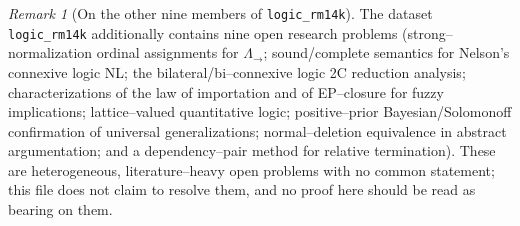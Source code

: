 \documentclass[11pt]{article}
\theoremstyle{definition}
\theoremstyle{remark}
\newtheorem{remark}{Remark}
\begin{document}
\begin{remark}[On the other nine members of \texttt{logic\_rm14k}]
The dataset \texttt{logic\_rm14k} additionally contains nine open research
problems (strong--normalization ordinal assignments for $\Lambda_\to$;
sound/complete semantics for Nelson's connexive logic NL; the
bilateral/bi--connexive logic 2C reduction analysis; characterizations of the law
of importation and of EP--closure for fuzzy implications; lattice--valued
quantitative logic; positive--prior Bayesian/Solomonoff confirmation of universal
generalizations; normal--deletion equivalence in abstract argumentation; and a
dependency--pair method for relative termination). These are heterogeneous,
literature--heavy open problems with no common statement; this file does not
claim to resolve them, and no proof here should be read as bearing on them.
\end{remark}
\end{document}
